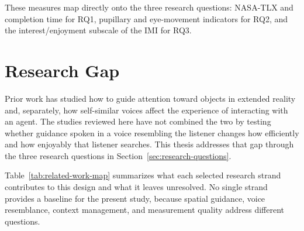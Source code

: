 These measures map directly onto the three research questions: NASA-TLX and completion time for RQ1, pupillary and eye-movement indicators for RQ2, and the interest/enjoyment subscale of the IMI for RQ3.

\section{Research Gap}
Prior work has studied how to guide attention toward objects in extended reality and, separately, how self-similar voices affect the experience of interacting with an agent. The studies reviewed here have not combined the two by testing whether guidance spoken in a voice resembling the listener changes how efficiently and how enjoyably that listener searches. This thesis addresses that gap through the three research questions in Section~\ref{sec:research-questions}.


Table~\ref{tab:related-work-map} summarizes what each selected research strand contributes to this design and what it leaves unresolved. No single strand provides a baseline for the present study, because spatial guidance, voice resemblance, context management, and measurement quality address different questions.

